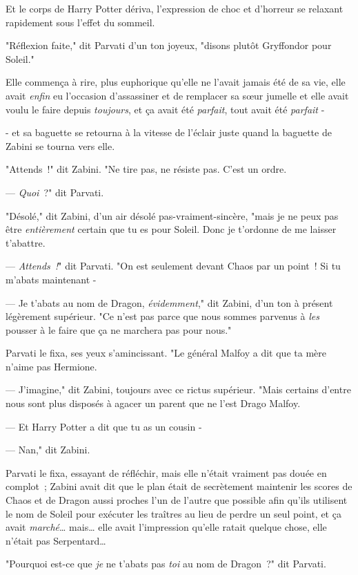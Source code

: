 Et le corps de Harry Potter dériva, l'expression de choc et d'horreur se relaxant rapidement sous l'effet du sommeil.

"Réflexion faite," dit Parvati d'un ton joyeux, "disons plutôt Gryffondor pour Soleil."

Elle commença à rire, plus euphorique qu'elle ne l'avait jamais été de sa vie, elle avait \emph{enfin} eu l'occasion d'assassiner et de remplacer sa sœur jumelle et elle avait voulu le faire depuis \emph{toujours}, et ça avait été \emph{parfait}, tout avait été \emph{parfait} -

- et sa baguette se retourna à la vitesse de l'éclair juste quand la baguette de Zabini se tourna vers elle.

"Attends~!" dit Zabini. "Ne tire pas, ne résiste pas. C'est un ordre.

--- \emph{Quoi}~?" dit Parvati.

"Désolé," dit Zabini, d'un air désolé pas-vraiment-sincère, "mais je ne peux pas être \emph{entièrement} certain que tu es pour Soleil. Donc je t'ordonne de me laisser t'abattre.

--- \emph{Attends~!}" dit Parvati. "On est seulement devant Chaos par un point~! Si tu m'abats maintenant -

--- Je t'abats au nom de Dragon, \emph{évidemment}," dit Zabini, d'un ton à présent légèrement supérieur. "Ce n'est pas parce que nous sommes parvenus à \emph{les} pousser à le faire que ça ne marchera pas pour nous."

Parvati le fixa, ses yeux s'amincissant. "Le général Malfoy a dit que ta mère n'aime pas Hermione.

--- J'imagine," dit Zabini, toujours avec ce rictus supérieur. "Mais certains d'entre nous sont plus disposés à agacer un parent que ne l'est Drago Malfoy.

--- Et Harry Potter a dit que tu as un cousin -

--- Nan," dit Zabini.

Parvati le fixa, essayant de réfléchir, mais elle n'était vraiment pas douée en complot~; Zabini avait dit que le plan était de secrètement maintenir les scores de Chaos et de Dragon aussi proches l'un de l'autre que possible afin qu'ils utilisent le nom de Soleil pour exécuter les traîtres au lieu de perdre un seul point, et ça avait \emph{marché}… mais… elle avait l'impression qu'elle ratait quelque chose, elle n'était pas Serpentard…

"Pourquoi est-ce que \emph{je} ne t'abats pas \emph{toi} au nom de Dragon~?" dit Parvati.

